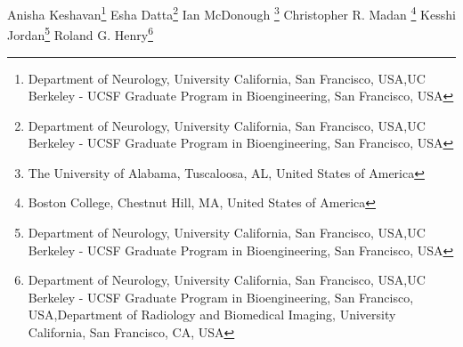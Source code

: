\iflatexml
Anisha Keshavan\footnote[1,2]{Department of Neurology, University California, San Francisco,  USA,UC Berkeley - UCSF Graduate Program in Bioengineering, San Francisco, USA}
Esha Datta\footnote[1,2]{Department of Neurology, University California, San Francisco,  USA,UC Berkeley - UCSF Graduate Program in Bioengineering, San Francisco, USA}
Ian McDonough \footnote[3] {The University of Alabama, Tuscaloosa, AL, United States of America}
Christopher R. Madan \footnote[4]{Boston College, Chestnut Hill, MA, United States of America}
Kesshi Jordan\footnote[1,2]{Department of Neurology, University California, San Francisco,  USA,UC Berkeley - UCSF Graduate Program in Bioengineering, San Francisco, USA}
Roland G. Henry\footnote[1,2,5]{Department of Neurology, University California, San Francisco,  USA,UC Berkeley - UCSF Graduate Program in Bioengineering, San Francisco, USA,Department of Radiology and Biomedical Imaging, University California, San Francisco, CA, USA}

\else %

\author[l1,l2]{Anisha Keshavan}

\author[l1,l2]{Esha Datta}

\author[3]{Ian McDonough}

\author[4]{Christopher R Madan}

\author[l1,l2]{Kesshi Jordan}

\author[l1,l2,5]{Roland G. Henry}

\address[l1]{Department of Neurology, University California, San Francisco,  USA}
\address[l2]{UC Berkeley - UCSF Graduate Program in Bioengineering, San Francisco, USA}
\address[3]{The University of Alabama, Tuscaloosa, AL, United States of America}
\address[4]{Boston College, Chestnut Hill, MA, United States of America}
\address[5]{Department of Radiology and Biomedical Imaging, University California, San Francisco, CA, USA}

\fi